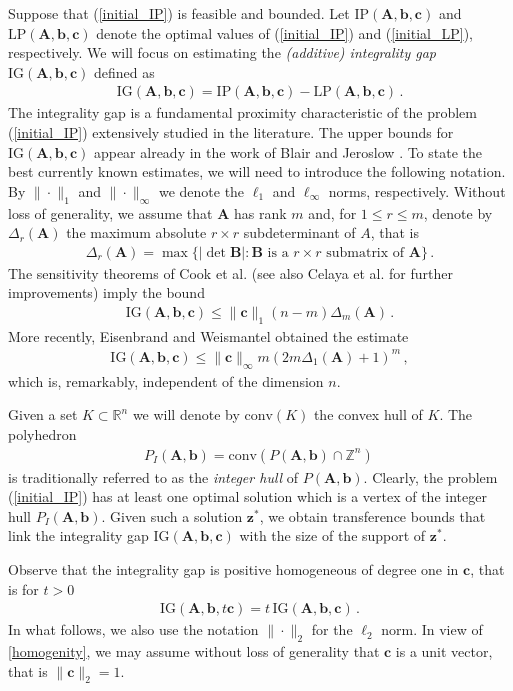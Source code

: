 \documentclass[runningheads]{llncs}
\newcommand{\ve}{\boldsymbol}
\newcommand{\be}{\begin{eqnarray}}
\newcommand{\bea}{\begin{eqnarray*}}
\newcommand{\ee}{\end{eqnarray}}
\newcommand{\eea}{\end{eqnarray*}}
\newcommand{\conv}{\mathrm{conv}}
\newcommand{\R}{\mathbb R}
\newcommand{\Z}{\mathbb Z}
\newcommand{\KP}{{P}}
\renewcommand\>{\rangle}
\newcommand\<{\langle}
\newcommand\0{\mathbf{0}}
\newcommand\bb{\ve b}%
\newcommand\cc{\ve c}%
\newcommand\BB{\ve B}%
\renewcommand\AA{\ve A}%
\newcommand\IG{\mathrm{IG}}%
\newcommand\IP{\mathrm{IP}}%
\newcommand\LP{\mathrm{LP}}%
\begin{document}
Suppose that (\ref{initial_IP}) is feasible and bounded. Let $\IP(\AA,\bb,\cc)$ and $\LP(\AA,\bb,\cc)$ denote the optimal
values of (\ref{initial_IP}) and (\ref{initial_LP}), respectively.
We will focus on estimating the  \emph{(additive) integrality gap} $\IG(\AA,\bb,\cc)$ defined as
%
\begin{eqnarray*}
\IG(\AA,\bb,\cc)=\IP(\AA,\bb,\cc)-\LP(\AA,\bb,\cc)\,.
\end{eqnarray*}
The integrality gap is a fundamental proximity characteristic of the problem (\ref{initial_IP}) extensively studied in the literature. The upper bounds for $\IG(\AA,\bb,\cc)$ appear already in the work of Blair and Jeroslow \cite{B_and_J_value_1,B_and_J_value}. To state the best currently known estimates, we will need to introduce the following notation. By $\|\cdot\|_1$ and $\|\cdot\|_\infty$ we denote the $\ell_1$ and $\ell_\infty$
norms, respectively. Without loss of generality, we assume that $\AA$ has rank $m$ and, for $1\le r\le m$, denote by $\Delta_r(\AA)$ the maximum absolute $r\times r$ subdeterminant of $A$, that is 
%
\bea
\Delta_r(\AA)=\max\{|\det \BB|: \BB \mbox{ is a }r\times r\mbox{ submatrix of }\AA\}\,.
\eea
%
The sensitivity theorems of Cook et al. 
\cite{MR839604} (see also Celaya et al. \cite{CKPW} for further improvements) imply the bound
%
\be\label{IG_C}
\IG(\AA,\bb,\cc)\le \|{\ve c}\|_1 (n-m) \Delta_m(\AA)\,.
\ee
%
More recently, Eisenbrand and Weismantel \cite{MR3775840} obtained the estimate
%
\be\label{IG_EW}
\IG(\AA,\bb,\cc)\le \|{\ve c}\|_\infty m (2m\Delta_1(\AA)+1)^m\,,
\ee
which is, remarkably, independent of the dimension $n$. 

Given a set $K\subset \R^n$ we will denote by $\conv(K)$ the convex hull of $K$. The polyhedron 
\bea
\KP_I(\AA,\bb)=\conv(\KP(\AA,\bb)\cap \Z^n)\,
\eea
is traditionally referred to as the {\em integer hull} of $\KP(\AA,\bb)$. Clearly, the problem (\ref{initial_IP}) has at least one optimal solution which is a vertex of the integer hull $\KP_I(\AA,\bb)$. 
Given such a solution $\ve z^*$, we obtain transference bounds that link the integrality gap $\IG(\AA,\bb,\cc)$ with the size of the support of  $\ve z^*$. 

Observe  that the integrality gap is positive homogeneous of degree one in ${\ve c}$, that is for $t>0$
\be\label{homogenity}
\IG(\AA,\bb,t\cc)=t\,\IG(\AA,\bb,\cc)\,.
\ee
In what follows, we also use the notation $\|\cdot\|_2$ for the $\ell_2$ norm.
In view of \eqref{homogenity}, we may assume without loss of generality that ${\ve c}$ is a unit vector, that is $\|{\ve c}\|_2=1$.
\end{document}
